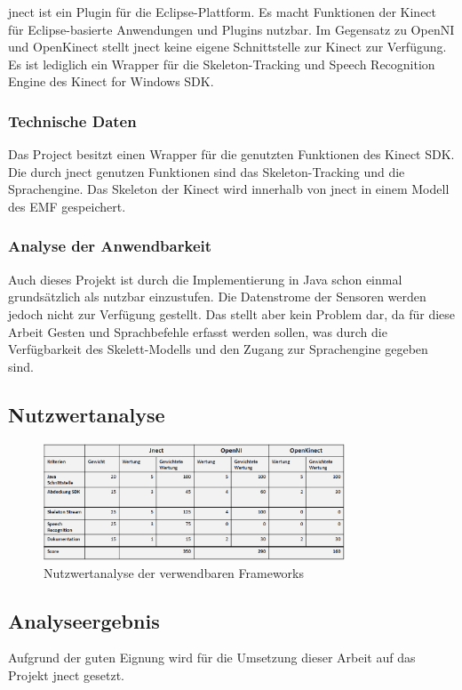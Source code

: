 jnect ist ein Plugin f\"ur die Eclipse-Plattform. Es macht Funktionen der Kinect f\"ur Eclipse-basierte Anwendungen und Plugins nutzbar. 
Im Gegensatz zu OpenNI und OpenKinect stellt jnect keine eigene Schnittstelle zur Kinect zur Verf\"ugung. Es ist lediglich ein Wrapper f\"ur die Skeleton-Tracking und Speech Recognition Engine des Kinect for Windows SDK. 

\subsubsection{Technische Daten}

Das Project besitzt einen Wrapper f\"ur die genutzten Funktionen des Kinect SDK. Die durch jnect genutzen Funktionen sind das Skeleton-Tracking 
und die Sprachengine. Das Skeleton der Kinect wird innerhalb von jnect in einem Modell des \gls{EMF} gespeichert.

\subsubsection{Analyse der Anwendbarkeit}

Auch dieses Projekt ist durch die Implementierung in Java schon einmal grundsätzlich als nutzbar einzustufen. Die Datenstrome 
der Sensoren werden jedoch nicht zur Verfügung gestellt. Das stellt aber kein Problem dar, da für diese Arbeit Gesten und Sprachbefehle 
erfasst werden sollen, was durch die Verfügbarkeit des Skelett-Modells und den Zugang zur Sprachengine gegeben sind.

\subsection{Nutzwertanalyse}

\begin{figure}[htb]
\centering
\includegraphics[width=0.8\textwidth]{img/04kapitel/nutzwert.png}
\caption[Nutzwertanalyse Frameworks]{Nutzwertanalyse der verwendbaren Frameworks}
\label{fig:nutzwert}
\end{figure}


\subsection{Analyseergebnis}

Aufgrund der guten Eignung wird für die Umsetzung dieser Arbeit auf das Projekt jnect gesetzt.